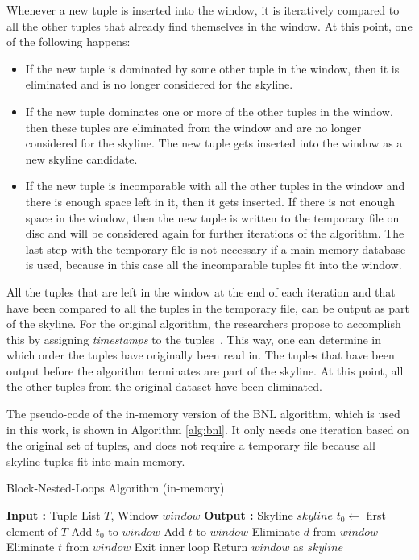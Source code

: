 Whenever a new tuple is inserted into the window, it is iteratively compared to all the other tuples that already find themselves in the window. At this point, one of the following happens: 
\begin{itemize}
	\item If the new tuple is dominated by some other tuple in the window, then it is eliminated and is no longer considered for the skyline. 
	\item If the new tuple dominates one or more of the other tuples in the window, then these tuples are eliminated from the window and are no longer considered for the skyline. The new tuple gets inserted into the window as a new skyline candidate. 
	\item If the new tuple is incomparable with all the other tuples in the window and there is enough space left in it, then it gets inserted. If there is not enough space in the window, then the new tuple is written to the temporary file on disc and will be considered again for further iterations of the algorithm. The last step with the temporary file is not necessary if a main memory database is used, because in this case all the incomparable tuples fit into the window. 
\end{itemize}
All the tuples that are left in the window at the end of each iteration and that have been compared to all the tuples in the temporary file, can be output as part of the skyline. For the original algorithm, the researchers propose to accomplish this by assigning \textit{timestamps} to the tuples~\cite{kossmann}. This way, one can determine in which order the tuples have originally been read in. The tuples that have been output before the algorithm terminates are part of the skyline. At this point, all the other tuples from the original dataset have been eliminated. 

The pseudo-code of the in-memory version of the BNL algorithm, which is used in this work, is shown in Algorithm \ref{alg:bnl}. It only needs one iteration based on the original set of tuples, and does not require a temporary file because all skyline tuples fit into main memory. 

\begin{algorithm}[h]
	\caption{Block-Nested-Loops Algorithm (in-memory)} \label{alg:bnl}
	\begin{algorithmic}[1] 
		\State \textbf{Input :} Tuple List $T$, Window $window$
		\State \textbf{Output :} Skyline $skyline$
		\State $t_{0} \gets $ first element of $T$
		\State Add $t_{0}$ to $window$
			\State Add $t$ to $window$
					\State Eliminate $d$ from $window$
				\EndIf
					\State Eliminate $t$ from $window$
					\State Exit inner loop 
				\EndIf
			\EndFor
		\EndFor
		\State Return $window$ as $skyline$
	\end{algorithmic}
\end{algorithm}

